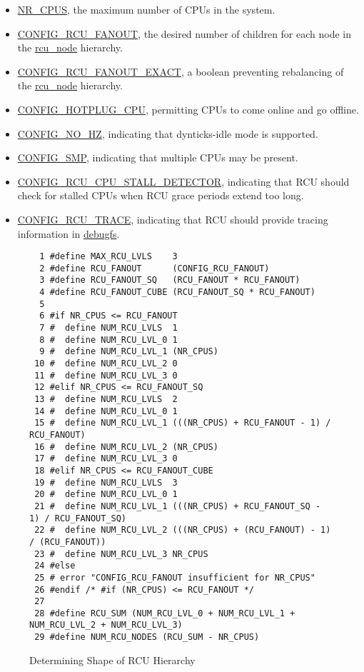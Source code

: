 \begin{itemize}
\item	\url{NR_CPUS}, the maximum number of CPUs in the system.
\item	\url{CONFIG_RCU_FANOUT}, the desired number of children for
	each node in the \url{rcu_node} hierarchy.
\item	\url{CONFIG_RCU_FANOUT_EXACT}, a boolean preventing rebalancing
	of the \url{rcu_node} hierarchy.
\item	\url{CONFIG_HOTPLUG_CPU}, permitting CPUs to come online and go
	offline.
\item	\url{CONFIG_NO_HZ}, indicating that dynticks-idle mode is supported.
\item	\url{CONFIG_SMP}, indicating that multiple CPUs may be present.
\item	\url{CONFIG_RCU_CPU_STALL_DETECTOR}, indicating that RCU should
	check for stalled CPUs when RCU grace periods extend too long.
\item	\url{CONFIG_RCU_TRACE}, indicating that RCU should provide
	tracing information in \url{debugfs}.
\end{itemize}

\begin{figure*}[htbp]
{
\begin{verbatim}
  1 #define MAX_RCU_LVLS    3
  2 #define RCU_FANOUT      (CONFIG_RCU_FANOUT)
  3 #define RCU_FANOUT_SQ   (RCU_FANOUT * RCU_FANOUT)
  4 #define RCU_FANOUT_CUBE (RCU_FANOUT_SQ * RCU_FANOUT)
  5 
  6 #if NR_CPUS <= RCU_FANOUT
  7 #  define NUM_RCU_LVLS  1
  8 #  define NUM_RCU_LVL_0 1
  9 #  define NUM_RCU_LVL_1 (NR_CPUS)
 10 #  define NUM_RCU_LVL_2 0
 11 #  define NUM_RCU_LVL_3 0
 12 #elif NR_CPUS <= RCU_FANOUT_SQ
 13 #  define NUM_RCU_LVLS  2
 14 #  define NUM_RCU_LVL_0 1
 15 #  define NUM_RCU_LVL_1 (((NR_CPUS) + RCU_FANOUT - 1) / RCU_FANOUT)
 16 #  define NUM_RCU_LVL_2 (NR_CPUS)
 17 #  define NUM_RCU_LVL_3 0
 18 #elif NR_CPUS <= RCU_FANOUT_CUBE
 19 #  define NUM_RCU_LVLS  3
 20 #  define NUM_RCU_LVL_0 1
 21 #  define NUM_RCU_LVL_1 (((NR_CPUS) + RCU_FANOUT_SQ - 1) / RCU_FANOUT_SQ)
 22 #  define NUM_RCU_LVL_2 (((NR_CPUS) + (RCU_FANOUT) - 1) / (RCU_FANOUT))
 23 #  define NUM_RCU_LVL_3 NR_CPUS
 24 #else
 25 # error "CONFIG_RCU_FANOUT insufficient for NR_CPUS"
 26 #endif /* #if (NR_CPUS) <= RCU_FANOUT */
 27 
 28 #define RCU_SUM (NUM_RCU_LVL_0 + NUM_RCU_LVL_1 + NUM_RCU_LVL_2 + NUM_RCU_LVL_3)
 29 #define NUM_RCU_NODES (RCU_SUM - NR_CPUS)
\end{verbatim}
}
\caption{Determining Shape of RCU Hierarchy}
\label{fig:app:rcuimpl:rcutreewt:Determining Shape of RCU Hierarchy}
\end{figure*}

